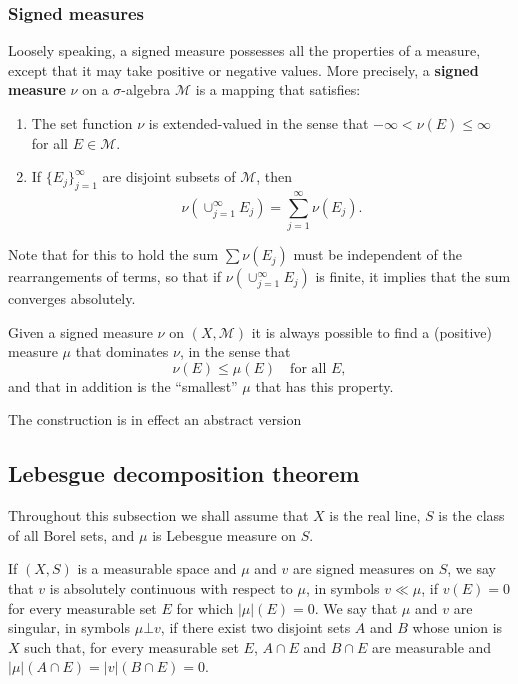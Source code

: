 \subsubsection{Signed measures}

Loosely speaking, a signed measure possesses all the properties of a measure, 
except that it may take positive or negative values. 
More precisely, 
a \textbf{signed measure} $\nu$ on a $\sigma$-algebra $\mathcal M$ is a mapping that satisfies:
\begin{enumerate}
  \item The set function $\nu$ is extended-valued in the sense that $-\infty<\nu(E)\leq\infty$ for all $E\in\mathcal M$.
  \item If $\{E_j\}_{j=1}^\infty$ are disjoint subsets of $\mathcal M$, then 
  \[
  \nu\left(\cup_{j=1}^\infty E_j\right) = \sum_{j=1}^\infty\nu(E_j).
  \]
\end{enumerate}

Note that for this to hold the sum $\sum\nu(E_j)$ must be independent of the rearrangements of terms,
so that if $\nu(\cup_{j=1}^\infty E_j)$ is finite, 
it implies that the sum converges absolutely.

Given a signed measure $\nu$ on $(X,\mathcal M)$ it is always possible to find a 
(positive) measure $\mu$ that dominates $\nu$, in the sense that 
\[
\nu(E)\leq\mu(E)\quad \text{for all } E,
\]
and that in addition is the ``smallest'' $\mu$ that has this property.

The construction is in effect an abstract version 

\subsection{Lebesgue decomposition theorem}



Throughout this subsection we shall assume that $X$ is the real line, 
$S$ is the class of all Borel sets,
and $\mu$ is Lebesgue measure on $S$.

If $(X, S)$ is a measurable space and $\mu$ and $v$ are signed measures on $S$, 
we say that $v$ is absolutely continuous with respect to $\mu$,
in symbols $v \ll \mu$, if $v(E) = 0$ for every measurable set $E$ for which $|\mu|(E) = 0$.
We say that $\mu$ and $v$ are singular, in symbols $\mu \bot v$,
if there exist two disjoint sets $A$ and $B$ whose union is $X$ such that,
for every measurable set $E$, $A\cap E$ and $B\cap E$ are measurable and 
$|\mu|(A\cap E) = |v|(B\cap E) = 0$.


